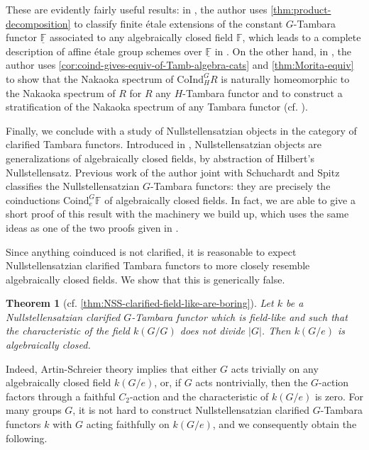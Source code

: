 \documentclass[11pt,dvipsnames]{amsart}
\newcommand{\F}{\mathbb{F}}
\newtheorem{theoremLET}{Theorem}
\theoremstyle{BoldRemark}
\newcommand{\Coind}{\mathrm{CoInd}}
\begin{document}
These are evidently fairly useful results: in \cite[Theorem C]{Wis25c}, the author uses \cref{thm:product-decomposition} to classify finite \'{e}tale extensions of the constant $G$-Tambara functor $\underline{\F}$ associated to any algebraically closed field $\F$, which leads to a complete description of affine \'{e}tale group schemes over $\underline{\F}$ in \cite[Corollary D]{Wis25c}. On the other hand, in \cite{Wis25b}, the author uses \cref{cor:coind-gives-equiv-of-Tamb-algebra-cats} and \cref{thm:Morita-equiv} to show that the Nakaoka spectrum of $\Coind_H^G R$ is naturally homeomorphic to the Nakaoka spectrum of $R$ for $R$ any $H$-Tambara functor and to construct a stratification of the Nakaoka spectrum of any Tambara functor (cf. \cite[Theorem A, Definition B]{Wis25b}).

Finally, we conclude with a study of Nullstellensatzian objects in the category of clarified Tambara functors. Introduced in \cite{BSY22}, Nullstellensatzian objects are generalizations of algebraically closed fields, by abstraction of Hilbert's Nullstellensatz. Previous work of the author joint with Schuchardt and Spitz classifies the Nullstellensatzian $G$-Tambara functors: they are precisely the coinductions $\mathrm{Coind}_e^G \F$ of algebraically closed fields. In fact, we are able to give a short proof of this result with the machinery we build up, which uses the same ideas as one of the two proofs given in \cite{SSW24}.

Since anything coinduced is not clarified, it is reasonable to expect Nullstellensatzian clarified Tambara functors to more closely resemble algebraically closed fields. We show that this is generically false.

\begin{theoremLET}[cf. \cref{thm:NSS-clarified-field-like-are-boring}]
	Let $k$ be a Nullstellensatzian clarified $G$-Tambara functor which is field-like and such that the characteristic of the field $k(G/G)$ does not divide $|G|$. Then $k(G/e)$ is algebraically closed.
\end{theoremLET}

Indeed, Artin-Schreier theory \cite{AS27a} \cite{AS27b} implies that either $G$ acts trivially on any algebraically closed field $k(G/e)$, or, if $G$ acts nontrivially, then the $G$-action factors through a faithful $C_2$-action and the characteristic of $k(G/e)$ is zero. For many groups $G$, it is not hard to construct Nullstellensatzian clarified $G$-Tambara functors $k$ with $G$ acting faithfully on $k(G/e)$, and we consequently obtain the following.
\end{document}
